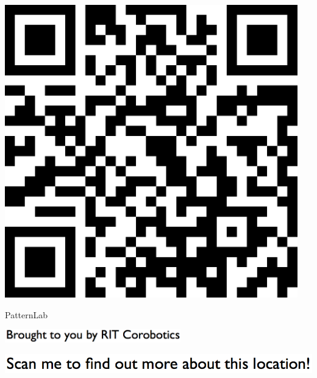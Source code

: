\documentclass[letterpaper]{article}
\begin{document}
 \begingroup 
 \centerline{\includegraphics[scale=1,width=5in,height=5in]{PatternLab.png}} 
 \endgroup 
 \vspace*{\fill} 

 \hfill{\small PatternLab} 

  \vspace{0.7in} 
 
 \centerline{\includegraphics[scale=1,width=3in]{text-bottom.png}} 
 
 \pagebreak 
{} 
 \vspace*{\fill} 
 
  \centerline{\includegraphics[scale=1,width=6in]{text-top.png}} 
 
 \vspace{0.5in} 
 
\end{document}
